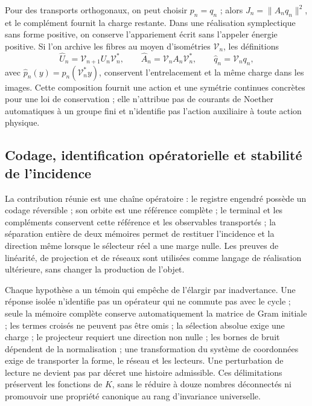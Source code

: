 Pour des transports orthogonaux, on peut choisir \(p_n=q_n\) ; alors
\(J_n=\|A_nq_n\|^2\), et le complément fournit la charge
restante. Dans une réalisation symplectique sans forme positive, on conserve
l’appariement écrit sans l’appeler énergie positive. Si l’on
archive les fibres au moyen d’isométries \(\mathcal V_n\), les
définitions
\[
 \widehat U_n=\mathcal V_{n+1}U_n\mathcal V_n^*,\qquad
 \widehat A_n=\mathcal V_nA_n\mathcal V_n^*,\qquad
 \widehat q_n=\mathcal V_nq_n,
\]
avec \(\widehat p_n(y)=p_n(\mathcal V_n^*y)\), conservent
l’entrelacement et la même charge dans les images. Cette composition
fournit une action et une symétrie continues concrètes pour une loi de
conservation ; elle n’attribue pas de courants de Noether automatiques à un groupe
fini et n’identifie pas l’action auxiliaire à toute action physique.

\subsection{Codage, identification opératorielle et stabilité de l'incidence}
\label{lib01:alcance}

La contribution réunie est une chaîne opératoire : le registre engendré possède un codage réversible ; son orbite est une référence complète ; le terminal et les compléments conservent cette référence et les observables transportés ; la séparation entière de deux mémoires permet de restituer l'incidence et la direction même lorsque le sélecteur réel a une marge nulle. Les preuves de linéarité, de projection et de réseaux sont utilisées comme langage de réalisation ultérieure, sans changer la production de l'objet.

Chaque hypothèse a un témoin qui empêche de l’élargir par inadvertance.
Une réponse isolée n’identifie pas un opérateur qui ne commute pas avec le
cycle ; seule la mémoire complète conserve automatiquement la matrice de Gram initiale ;
les termes croisés ne peuvent pas être omis ; la sélection absolue exige une
charge ; le projecteur requiert une direction non nulle ; les bornes de bruit
dépendent de la normalisation ; une transformation du système de coordonnées exige de transporter
la forme, le réseau et les lecteurs. Une perturbation de lecture ne devient pas par
décret une histoire admissible. Ces délimitations préservent les
fonctions de \(K\), sans le réduire à douze nombres déconnectés ni
promouvoir une propriété canonique au rang d’invariance universelle.
